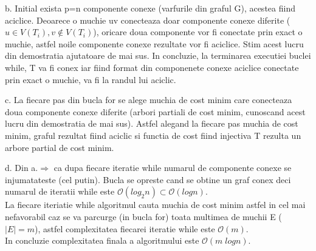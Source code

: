 \documentclass[11pt,leqno]{article}
\def\ClasaO{{\mathcal O}}
\begin{document}
b. Initial exista p=n componente conexe (varfurile din graful G), acestea fiind aciclice. Deoarece o muchie uv conecteaza doar componente conexe diferite ($u \in V(T_i), v \notin V(T_i)$), oricare doua componente vor fi conectate prin exact o muchie,
astfel noile componente conexe rezultate vor fi aciclice. Stim acest lucru din demostratia ajutatoare de mai sus. 
In concluzie, la terminarea executiei buclei while, T va fi conex iar fiind format din componenete conexe aciclice conectate prin exact o muchie, va fi la  randul lui aciclic.


c. La fiecare pas din bucla for se alege muchia de cost minim care conecteaza doua componente conexe diferite (arbori partiali de cost minim, cunoscand acest lucru din demostratia de mai sus). 
Astfel alegand la fiecare pas muchia de cost minim, graful rezultat fiind aciclic si functia de cost fiind injectiva T rezulta un arbore partial de cost minim.

d. Din a.$\Rightarrow$ ca dupa fiecare iteratie while numarul de componente conexe se injumatateste (cel putin). Bucla se opreste cand se obtine un graf conex deci numarul de iteratii while este $\ClasaO(log_2 n) \subset \ClasaO(log n)$.\\
La fiecare iteriatie while algoritmul cauta muchia de cost minim astfel in cel mai nefavorabil caz se va parcurge (in bucla for) toata multimea de muchii E ($|E|=m$), astfel complexitatea fiecarei iteratie while este $\ClasaO(m)$.\\
In concluzie complexitatea finala a algoritmului este $\ClasaO(m\;log n)$.
\end{document}
